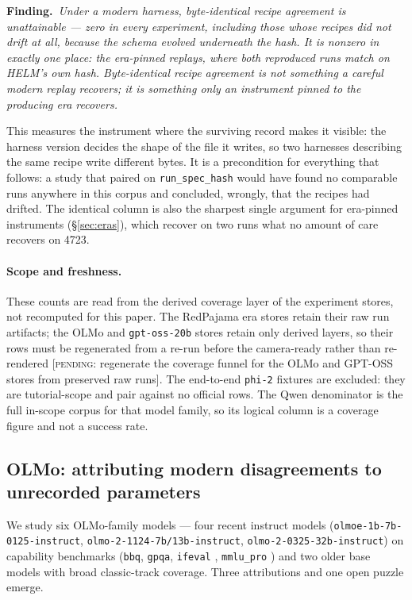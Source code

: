 \par\smallskip\noindent\textbf{Finding.}~\emph{Under a modern harness, byte-identical
recipe agreement is unattainable --- zero in every experiment, including those
whose recipes did not drift at all, because the schema evolved underneath the
hash. It is nonzero in exactly one place: the era-pinned replays, where both
reproduced runs match on HELM's own hash. Byte-identical recipe agreement is not
something a careful modern replay recovers; it is something only an instrument
pinned to the producing era recovers.}\par\smallskip

This measures the instrument where the surviving record makes it visible: the
harness version decides the shape of the file it writes, so two harnesses
describing the same recipe write different bytes. It is a precondition for
everything that follows: a study that paired on
\texttt{run\_spec\_hash} would have found no comparable runs anywhere in this
corpus and concluded, wrongly, that the recipes had drifted. The identical column
is also the sharpest single argument for era-pinned instruments (\S\ref{sec:eras}),
which recover on two runs what no amount of care recovers on 4723.

\paragraph{Scope and freshness.} These counts are read from the derived coverage
layer of the experiment stores, not recomputed for this paper. The RedPajama era
stores retain their raw run artifacts; the OLMo and \texttt{gpt-oss-20b} stores
retain only derived layers, so their rows must be regenerated from a re-run
before the camera-ready rather than re-rendered
{\color{orange}\textsf{\small[\textsc{pending}: regenerate the coverage funnel for
the OLMo and GPT-OSS stores from preserved raw runs]}}. The end-to-end
\texttt{phi-2} fixtures are excluded: they are tutorial-scope and pair against no
official rows. The Qwen denominator is the full in-scope corpus for that model
family, so its logical column is a coverage figure and not a success rate.

\subsection{OLMo: attributing modern disagreements to unrecorded parameters}
\label{sec:olmo}

We study six OLMo-family models
\citep{groeneveld2024olmo,olmo2_2024,muennighoff2024olmoe} --- four recent instruct models
(\texttt{olmoe-1b-7b-0125-instruct}, \texttt{olmo-2-1124-7b/13b-instruct},
\texttt{olmo-2-0325-32b-instruct}) on capability benchmarks
(\texttt{bbq}, \texttt{gpqa}, \texttt{ifeval} \citep{zhou2023ifeval},
\texttt{mmlu\_pro} \citep{hendrycks2021mmlu}) and two older base
models with broad classic-track coverage. Three attributions and one open puzzle
emerge.

